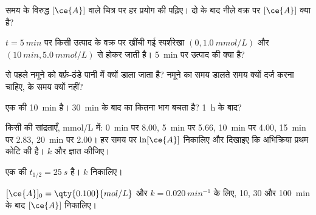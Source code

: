 \begin{exercise}[$\star$]\label{exo:g12:reaction-rates:2}
समय के विरुद्ध $[\ce{A}]$ वाले चित्र पर हर प्रयोग की  पढ़िए।
दो  के बाद नीले वक्र पर $[\ce{A}]$ क्या है?
\end{exercise}

\begin{exercise}[$\star$]\label{exo:g12:reaction-rates:3}
$t = \qty{5}{min}$ पर किसी उत्पाद के वक्र पर खींची गई स्पर्शरेखा
$(0, \qty{1.0}{mmol/L})$ और $(\qty{10}{min}, \qty{5.0}{mmol/L})$ से होकर जाती है।
\qty{5}{min} पर उत्पाद की  क्या है?
\end{exercise}

\begin{exercise}[$\star$]\label{exo:g12:reaction-rates:4}
 से पहले नमूने को बर्फ़-ठंडे पानी में क्यों डाला जाता है? नमूने का
समय डालते समय क्यों दर्ज करना चाहिए,  के समय
क्यों नहीं?
\end{exercise}

\begin{exercise}[$\star$]\label{exo:g12:reaction-rates:5}
एक  की  \qty{10}{min} है। \qty{30}{min} के बाद  का
कितना भाग बचता है? \qty{1}{h} के बाद?
\end{exercise}

\begin{exercise}[$\star\star$]\label{exo:g12:reaction-rates:6}
किसी  की सांद्रताएँ, \si{mmol/L} में: \qty{0}{min} पर 8.00, \qty{5}{min} पर 5.66,
\qty{10}{min} पर 4.00, \qty{15}{min} पर 2.83, \qty{20}{min} पर
2.00। हर समय पर $\ln[\ce{A}]$ निकालिए और दिखाइए कि
अभिक्रिया प्रथम कोटि की है। $k$ और  ज्ञात कीजिए।
\end{exercise}

\begin{exercise}[$\star\star$]\label{exo:g12:reaction-rates:7}
एक  की $t_{1/2} = \qty{25}{s}$ है। $k$ निकालिए।
\end{exercise}

\begin{exercise}[$\star\star$]\label{exo:g12:reaction-rates:8}
$[\ce{A}]_0 = \qty{0.100}{mol/L}$ और $k = \qty{0.020}{min^{-1}}$ के लिए,
10, 30 और \qty{100}{min} के बाद $[\ce{A}]$ निकालिए।
\end{exercise}

